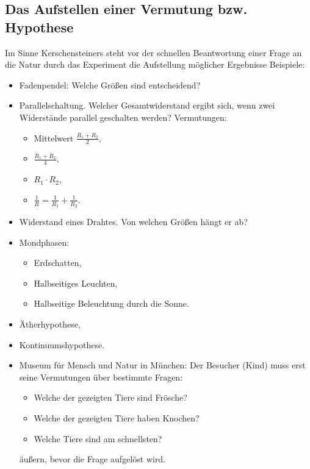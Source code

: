 \subsection{Das Aufstellen einer Vermutung bzw. Hypothese}
Im Sinne Kerschensteiners  steht vor der schnellen Beantwortung einer
Frage an die Natur durch das Experiment die Aufstellung m\"{o}glicher Ergebnisse
\bip
Beispiele:
\begin{itemize}
\item
Fadenpendel: Welche Gr\"{o}{\ss}en sind entscheidend?
\item Parallelschaltung. Welcher Gesamtwiderstand ergibt sich,
wenn zwei Widerst\"{a}nde parallel geschalten werden? Vermutungen:
    \begin{itemize}
      \item Mittelwert $\frac{R_1 + R_2}2$,
      \item $\frac{R_1+R_2}4$,
      \item $R_1 \cdot R_2$,
      \item $\frac{1}{R} = \frac{1}{R_1} + \frac{1}{R_2}$.
    \end{itemize}
\item Widerstand eines Drahtes. Von welchen Gr\"{o}{\ss}en h\"{a}ngt er ab?
\item Mondphasen:
\begin{itemize}
  \item Erdschatten,
  \item Halbseitiges Leuchten,
  \item Halbseitige Beleuchtung durch die Sonne.
\end{itemize}
\item \"{A}therhypothese,
\item Kontinuumshypothese.
\item Museum f\"{u}r Mensch und Natur in M\"{u}nchen: Der Besucher (Kind) muss erst
seine Vermutungen \"{u}ber bestimmte Fragen:
\begin{itemize}
\item Welche der gezeigten Tiere sind Fr\"{o}sche?
\item Welche der gezeigten Tiere haben Knochen?
\item Welche Tiere sind am schnellsten?
\end{itemize}
\"{a}u{\ss}ern, bevor die Frage aufgel\"{o}st wird.
\end{itemize}


\bip\bip

